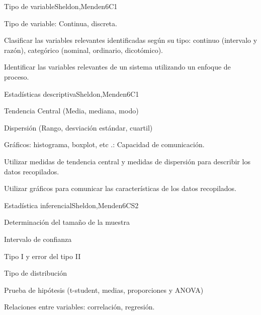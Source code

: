 \begin{syllabus}
\begin{unit}{Tipo de variable}{}{Sheldon,Menden}{6}{C1}
   \begin{topics}
      \item Tipo de variable: Continua, discreta.
   \end{topics}

   \begin{learningoutcomes}
      \item Clasificar las variables relevantes identificadas según su tipo: continuo (intervalo y razón), categórico (nominal, ordinario, dicotómico).
      \item Identificar las variables relevantes de un sistema utilizando un enfoque de proceso.
   \end{learningoutcomes}
\end{unit}

\begin{unit}{Estadísticas descriptiva}{}{Sheldon,Menden}{6}{C1}
\begin{topics}
      \item Tendencia Central (Media, mediana, modo)
      \item Dispersión (Rango, desviación estándar, cuartil)
      \item Gráficos: histograma, boxplot, etc .: Capacidad de comunicación.
   \end{topics}
   \begin{learningoutcomes}
      \item Utilizar medidas de tendencia central y medidas de dispersión para describir los datos recopilados.
      \item Utilizar gráficos para comunicar las características de los datos recopilados.
   \end{learningoutcomes}
\end{unit}

\begin{unit}{Estadística inferencial}{}{Sheldon,Menden}{6}{CS2}
\begin{topics}
      \item Determinación del tamaño de la muestra
      \item Intervalo de confianza
      \item Tipo I y error del tipo II
      \item Tipo de distribución
      \item Prueba de hipótesis (t-student, medias, proporciones y ANOVA)
      \item Relaciones entre variables: correlación, regresión.
   \end{topics}


\end{unit}
\end{syllabus}
